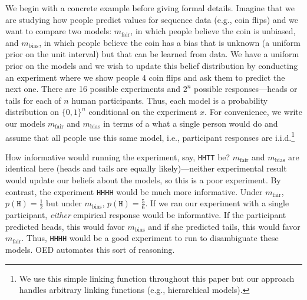 \documentclass{article}
\begin{document}
We begin with a concrete example before giving formal details.
Imagine that we are studying how people predict values for sequence data (e.g., coin flips) and we want to compare two models: $m_{\text{fair}}$, in which people believe the coin is unbiased, and $m_{\text{bias}}$, in which people believe the coin has a bias that is unknown (a uniform prior on the unit interval) but that can be learned from data.
We have a uniform prior on the models and we wish to update this belief distribution by conducting an experiment where we show people 4 coin flips and ask them to predict the next one.
There are 16 possible experiments and $2^n$ possible responses---heads or tails for each of $n$ human participants.
Thus, each model is a probability distribution on $\{0,1\}^n$ conditional on the experiment $x$.
For convenience, we write our models $m_{\text{fair}}$ and $m_{\text{bias}}$ in terms of a what a single person would do and assume that all people use this same model, i.e., participant responses are i.i.d.\footnote{We use this simple linking function throughout this paper but our approach handles arbitrary linking functions (e.g., hierarchical models).}

How informative would running the experiment, say, \lstinline{HHTT} be?
$m_{\text{fair}}$ and $m_{\text{bias}}$ are identical here (heads and tails are equally likely)---neither experimental result would update our beliefs about the models, so this is a poor experiment.
By contrast, the experiment \lstinline{HHHH} would be much more informative.
Under $m_{\text{fair}}$, $p(\texttt{H}) = \frac{1}{2}$ but under $m_{\text{bias}}$, $p(\texttt{H}) = \frac{5}{6}$.
If we ran our experiment with a single participant, \emph{either} empirical response would be informative.
If the participant predicted heads, this would favor $m_{\text{bias}}$ and if she predicted tails, this would favor $m_{\text{fair}}$.
Thus, \lstinline{HHHH} would be a good experiment to run to disambiguate these models.
OED automates this sort of reasoning.
\end{document}
